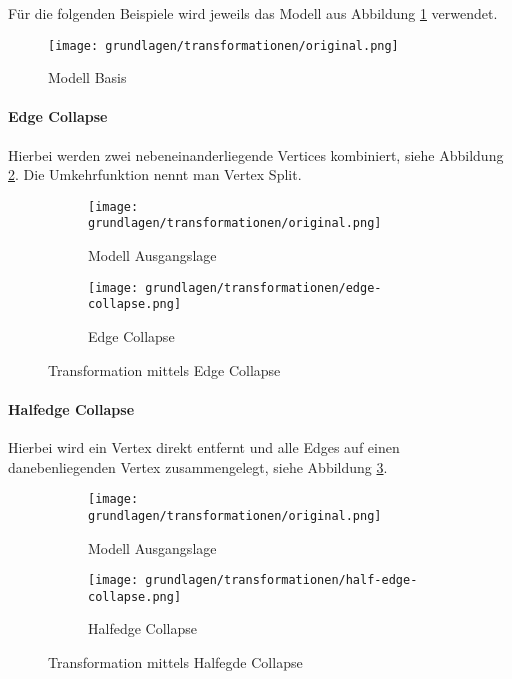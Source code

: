 Für die folgenden Beispiele wird jeweils das Modell aus Abbildung \ref{fig:transformationOriginal} verwendet.

\begin{figure}[H]
  \centering
  \texttt{[image: grundlagen/transformationen/original.png]}
  \caption{Modell Basis}
  \label{fig:transformationOriginal}
\end{figure}

\paragraph{Edge Collapse}
Hierbei werden zwei nebeneinanderliegende Vertices kombiniert, siehe Abbildung \ref{fig:transformationEdgeCollapse}.
Die Umkehrfunktion nennt man Vertex Split.

\begin{figure}[H]
  \centering
  \begin{subfigure}{.5\textwidth}
    \centering
    \texttt{[image: grundlagen/transformationen/original.png]}
    \caption{Modell Ausgangslage}
  \end{subfigure}%
  \begin{subfigure}{.5\textwidth}
    \centering
    \texttt{[image: grundlagen/transformationen/edge-collapse.png]}
    \caption{Edge Collapse}
  \end{subfigure}
  \caption{Transformation mittels Edge Collapse}
  \label{fig:transformationEdgeCollapse}
\end{figure}

\paragraph{Halfedge Collapse}
Hierbei wird ein Vertex direkt entfernt und alle Edges auf einen danebenliegenden Vertex zusammengelegt, siehe Abbildung \ref{fig:transformationHalfedgeCollapse}.

\begin{figure}[H]
  \centering
  \begin{subfigure}{.5\textwidth}
    \centering
    \texttt{[image: grundlagen/transformationen/original.png]}
    \caption{Modell Ausgangslage}
  \end{subfigure}%
  \begin{subfigure}{.5\textwidth}
    \centering
    \texttt{[image: grundlagen/transformationen/half-edge-collapse.png]}
    \caption{Halfedge Collapse}
  \end{subfigure}
  \caption{Transformation mittels Halfegde Collapse}
  \label{fig:transformationHalfedgeCollapse}
\end{figure}

